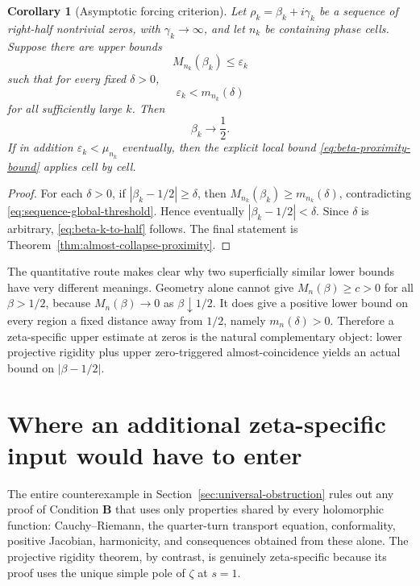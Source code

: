 \documentclass[11pt]{amsart}
\numberwithin{equation}{section}
\newtheorem{corollary}[theorem]{Corollary}
\begin{document}
\begin{corollary}[Asymptotic forcing criterion]
\label{cor:asymptotic-forcing}
Let $\rho_k=\beta_k+i\gamma_k$ be a sequence of right-half nontrivial zeros,
with $\gamma_k\to\infty$, and let $n_k$ be containing phase cells.  Suppose
there are upper bounds
\begin{equation}
 M_{n_k}(\beta_k)\leq\varepsilon_k
 \label{eq:sequence-upper-bound}
\end{equation}
such that for every fixed $\delta>0$,
\begin{equation}
 \varepsilon_k<m_{n_k}(\delta)
 \label{eq:sequence-global-threshold}
\end{equation}
for all sufficiently large $k$.  Then
\begin{equation}
 \beta_k\longrightarrow\frac12.
 \label{eq:beta-k-to-half}
\end{equation}
If in addition $\varepsilon_k<\mu_{n_k}$ eventually, then the explicit local
bound \eqref{eq:beta-proximity-bound} applies cell by cell.
\end{corollary}

\begin{proof}
For each $\delta>0$, if
$|\beta_k-1/2|\geq\delta$, then
$M_{n_k}(\beta_k)\geq m_{n_k}(\delta)$, contradicting
\eqref{eq:sequence-global-threshold}.  Hence eventually
$|\beta_k-1/2|<\delta$.  Since $\delta$ is arbitrary,
\eqref{eq:beta-k-to-half} follows.  The final statement is
Theorem~\ref{thm:almost-collapse-proximity}.
\end{proof}

The quantitative route makes clear why two superficially similar lower bounds
have very different meanings.  Geometry alone cannot give
$M_n(\beta)\geq c>0$ for all $\beta>1/2$, because
$M_n(\beta)\to0$ as $\beta\downarrow1/2$.  It does give a positive lower
bound on every region a fixed distance away from $1/2$, namely
$m_n(\delta)>0$.  Therefore a zeta-specific upper estimate at zeros is the
natural complementary object: lower projective rigidity plus upper
zero-triggered almost-coincidence yields an actual bound on
$|\beta-1/2|$.

\section{Where an additional zeta-specific input would have to enter}
\label{sec:zeta-specific-input}

The entire counterexample in Section~\ref{sec:universal-obstruction} rules out
any proof of Condition $\mathbf B$ that uses only properties shared by every
holomorphic function: Cauchy--Riemann, the quarter-turn transport equation,
conformality, positive Jacobian, harmonicity, and consequences obtained from
these alone.  The projective rigidity theorem, by contrast, is genuinely
zeta-specific because its proof uses the unique simple pole of $\zeta$ at
$s=1$.
\end{document}
